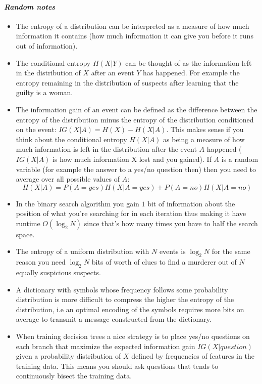 \paragraph{\textit{Random notes}}
\begin{itemize}
    \item The entropy of a distribution can be interpreted as a measure of how much information it contains (how much information it can give you before it runs out of information).
    \item
        The conditional entropy $H(X|Y)$ can be thought of as the information left in the distribution of $X$ after an event $Y$ has happened. For example the entropy remaining in the distribution of suspects after learning that the guilty is a woman.
    \item
        The information gain of an event can be defined as the difference between the entropy of the distribution minus the entropy of the distribution conditioned on the event: $IG(X|A) = H(X) - H(X|A)$. This makes sense if you think about the conditional entropy $H(X|A)$ as being a measure of how much information is left in the distribution after the event $A$ happened ($IG(X|A)$ is how much information X lost and you gained). If $A$ is a random variable (for example the answer to a yes/no question then) then you need to average over all possible values of $A$: $$H(X|A) = P(A=yes)H(X|A=yes) + P(A=no)H(X|A=no)$$
    \item
        In the binary search algorithm you gain $1$ bit of information about the position of what you're searching for in each iteration thus making it have runtime $O(\log_2{N})$ since that's how many times you have to half the search space.
    \item
        The entropy of a uniform distribution with $N$ events is $\log_2{N}$ for the same reason you need $\log_2{N}$ bits of worth of clues to find a murderer out of $N$ equally suspicious suspects.
    \item
        A dictionary with symbols whose frequency follows some probability distribution is more difficult to compress the higher the entropy of the distribution, i.e an optimal encoding of the symbols requires more bits on average to transmit a message constructed from the dictionary.
    \item
        When training decision trees a nice strategy is to place yes/no questions on each branch that maximize the expected information gain $IG(X|question)$ given a probability distribution of $X$ defined by frequencies of features in the training data. This means you should ask questions that tends to continuously bisect the training data.

\end{itemize}
